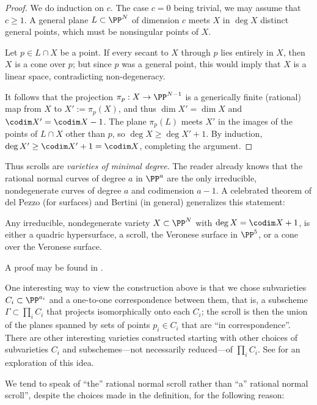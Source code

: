 \begin{proof} We do induction on $c$. The case $c=0$ being trivial,
 we may assume that $c\geq1$. A general plane $L\subset \PP^{N}$ of dimension $c$ meets $X$ in $\deg X$
 distinct general points, which must be nonsingular points of $X$.
 
Let $p\in L\cap X$ be a point. If every secant to $X$ through $p$ lies entirely in $X$, then $X$ is a cone over $p$; but since $p$ was a general point, this would imply that $X$ is a linear space, contradicting non-degeneracy. 

It follows that the projection $\pi_{p}:X \to \PP^{N-1}$ is a generically finite (rational) map from $X$ to $X' := \pi_{p}(X)$,
and thus $\dim X' = \dim X$ and $\codim X' = \codim X-1$. The plane 
$\pi_{p}(L)$ meets $X'$ in the images of the points of $L\cap X$ other than $p$, so
$\deg X\geq \deg X'+1$. By induction, $\deg X' \geq \codim X'+1 = \codim X$, completing the argument.
\end{proof}

Thus scrolls are \emph{varieties of minimal degree}. The reader already knows that the rational normal curves of degree $a$ in $\PP^{a}$ are the only irreducible, nondegenerate curves of degree $a$ and codimension $a-1$. A celebrated theorem of del Pezzo (for surfaces) and Bertini (in general) generalizes this statement:

\begin{fact}\label{classification of scrolls} 
Any irreducible, nondegenerate variety $X\subset \PP^{N}$  with $\deg X = \codim X+1$, is either a quadric hypersurface, a scroll, the Veronese surface in $\PP^{5}$, or a cone over the Veronese surface.
\end{fact}

A proof may be found in \cite{Eisenbud-Harris-Centennial}.

One interesting way to view the construction above is that we chose subvarieties $C_{i}\subset \PP^{a_{i}}$ and a one-to-one correspondence between them, that is, a subscheme
$\Gamma\subset \prod_{i}C_{i}$ that projects isomorphically onto each $C_{i}$; the scroll is then the
union of the planes spanned by sets of points $p_{i}\in C_{i}$ that are ``in correspondence''. There are other interesting varieties constructed starting with other choices of subvarieties $C_{i}$ and subschemes---not necessarily reduced---of $\prod_{i}C_{i}$. See \cite{Eisenbud-Sammartano} for an exploration of this idea.

We tend to speak of ``the'' rational normal scroll rather than ``a'' rational normal scroll'', despite the choices made in the definition, for the following reason:

